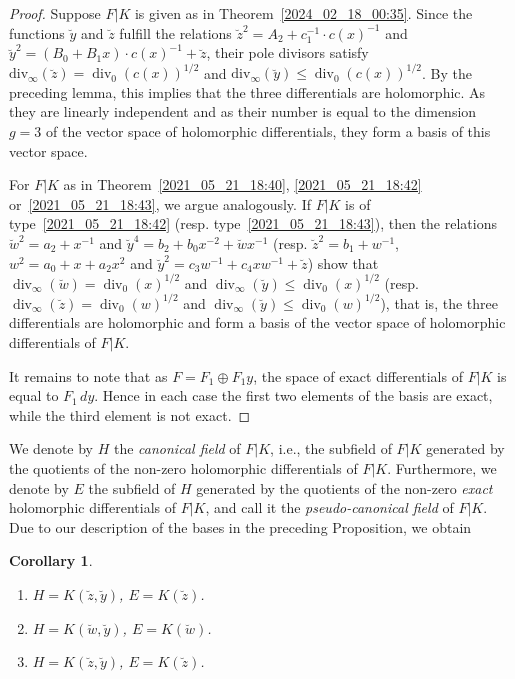\documentclass[12pt,reqno]{amsart}
\newtheorem{cor}[thm]{Corollary}
\theoremstyle{definition}
\DeclareMathOperator{\divv}{div}%
\begin{document}
\begin{proof}
Suppose $F|K$ is given as in Theorem~\ref{2024_02_18_00:35}.
Since the functions $\breve y$ and $\breve z$ fulfill the relations $\breve z^2 = A_2 + c_1^{-1} \cdot c(x)^{-1}$ and $\breve y^2 = (B_0 + B_1 x) \cdot c(x)^{-1} + \breve z$,
their pole divisors satisfy $\mathrm{div}_\infty(\breve z) = \divv_0(c(x))^{1/2}$ and $\mathrm{div}_\infty(\breve y) \leq \divv_0(c(x))^{1/2}$.
By the preceding lemma, this implies that the three differentials are holomorphic. As they are linearly independent and as their number is equal to the dimension $g=3$ of the vector space of holomorphic differentials, they form a basis of this vector space.

For $F|K$ as in Theorem~\ref{2021_05_21_18:40}, \ref{2021_05_21_18:42} or~\ref{2021_05_21_18:43}, we argue analogously.
If $F|K$ is of type~\ref{2021_05_21_18:42} (resp. type~\ref{2021_05_21_18:43}), then the relations
$\breve w^2 = a_2 + x^{-1}$ and $\breve y^4 = b_2 + b_0 x^{-2} + \breve w x^{-1}$
(resp. $\breve z^2 = b_1 + w^{-1}$, $w^2 = a_0 + x + a_2 x^2$ and $\breve y^2 = c_3 w^{-1} + c_4 x w^{-1} + \breve z$)
show that
$\divv_\infty(\breve w) = \divv_0(x)^{1/2}$ and $\divv_\infty(\breve y) \leq \divv_0(x)^{1/2}$
(resp. $\divv_\infty (\breve z) = \divv_0(w)^{1/2}$ and $\divv_\infty(\breve y)\leq \divv_0(w)^{1/2}$),
that is, the three differentials are holomorphic and form a basis of the vector space of holomorphic differentials of $F|K$.

It remains to note that as $F=F_1 \oplus F_1 y$, the space of exact differentials of $F|K$ is equal to $F_1 \, dy$.
Hence in each case the first two elements of the basis are exact, while the third element is not exact.
\end{proof}


We denote by $H$ the \textit{canonical field} of $F|K$, i.e., the subfield of $F|K$ generated by the quotients of the non-zero holomorphic differentials of $F|K$.
Furthermore, we denote by $E$ the subfield of $H$ generated by the quotients of the non-zero \textit{exact} holomorphic differentials of $F|K$, and call it the \textit{pseudo-canonical field} of $F|K$.
Due to our description of the bases in the preceding Proposition, we obtain

\begin{cor} $ $
\begin{enumerate}[\upshape (a)]
    \item $H = K(\breve z, \breve y)$, $E=K(\breve z)$.
    \item $H=K(\breve w,\breve y)$, $E=K(\breve w)$.
    \item $H=K(\breve z,\breve y)$, $E=K(\breve z)$.
\end{enumerate}
\end{cor}
\end{document}
